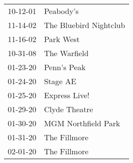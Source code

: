 \begin{supertabular}{p{0.07\textwidth}p{0.23\textwidth}}
 10-12-01 &               Peabody's \\
 11-14-02 &  The Bluebird Nightclub \\
 11-16-02 &               Park West \\
 10-31-08 &            The Warfield \\
 01-23-20 &             Penn's Peak \\
 01-24-20 &                Stage AE \\
 01-25-20 &           Express Live! \\
 01-29-20 &           Clyde Theatre \\
 01-30-20 &     MGM Northfield Park \\
 01-31-20 &            The Fillmore \\
 02-01-20 &            The Fillmore \\
\end{supertabular}

